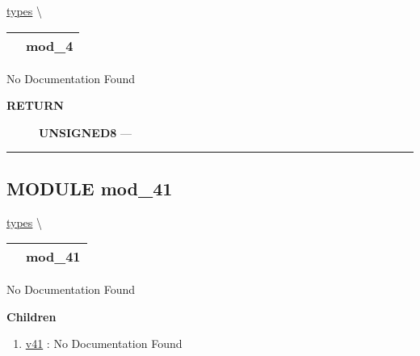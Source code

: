 \hypertarget{ecldoc:ecldoc-mod_4}{}
\hspace{0pt} \hyperlink{ecldoc:types}{types} \textbackslash 

{\renewcommand{\arraystretch}{1.5}
\begin{tabularx}{\textwidth}{|>{\raggedright\arraybackslash}l|X|}
\hline
\hspace{0pt}\mytexttt{\color{red} } & \textbf{mod\_4} \\
\hline
\end{tabularx}
}

\par





No Documentation Found








\par
\begin{description}
\item [\colorbox{tagtype}{\color{white} \textbf{\textsf{RETURN}}}] \textbf{UNSIGNED8} --- 
\end{description}




\rule{\linewidth}{0.5pt}
\subsection*{\textsf{\colorbox{headtoc}{\color{white} MODULE}
mod\_41}}

\hypertarget{ecldoc:types.mod_41}{}
\hspace{0pt} \hyperlink{ecldoc:types}{types} \textbackslash 

{\renewcommand{\arraystretch}{1.5}
\begin{tabularx}{\textwidth}{|>{\raggedright\arraybackslash}l|X|}
\hline
\hspace{0pt}\mytexttt{\color{red} } & \textbf{mod\_41} \\
\hline
\end{tabularx}
}

\par





No Documentation Found







\textbf{Children}
\begin{enumerate}
\item \hyperlink{ecldoc:types.mod_41.v41}{v41}
: No Documentation Found
\end{enumerate}

